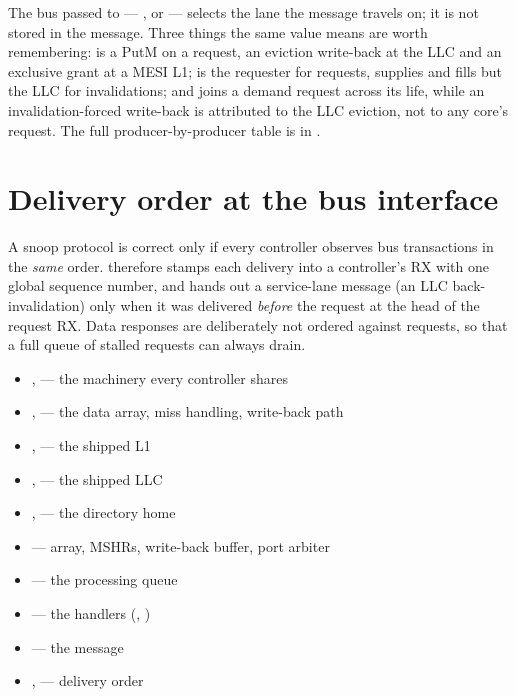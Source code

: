 The bus  passed to  --- , 
or  --- selects the lane the message travels on; it is not stored in the message.
Three things the same value means are worth remembering:  is a PutM on a request, an
eviction write-back at the LLC and an exclusive grant at a MESI L1;  is the requester
for requests, supplies and fills but the LLC for invalidations; and  joins a demand
request across its life, while an invalidation-forced write-back is attributed to the LLC
eviction, not to any core's request. The full producer-by-producer table is in
.

\section{Delivery order at the bus interface}

A snoop protocol is correct only if every controller observes bus transactions in the
\emph{same} order.  therefore stamps each delivery into a controller's RX
with one global sequence number, and  hands out a service-lane message
(an LLC back-invalidation) only when it was delivered \emph{before} the request at the head of
the request RX. Data responses are deliberately not ordered against requests, so that a full
queue of stalled requests can always drain.

\begin{wherebox}
\begin{itemize}[nosep,leftmargin=1.2em]
\item {},  --- the machinery every controller shares
\item {},  --- the data array, miss handling, write-back path
\item {},  --- the shipped L1
\item {},  --- the shipped LLC
\item {},  --- the directory home
\item {} --- array, MSHRs, write-back buffer, port arbiter
\item {} --- the processing queue
\item {} --- the handlers (, )
\item {} --- the message
\item {},  --- delivery order
\end{itemize}
\end{wherebox}
